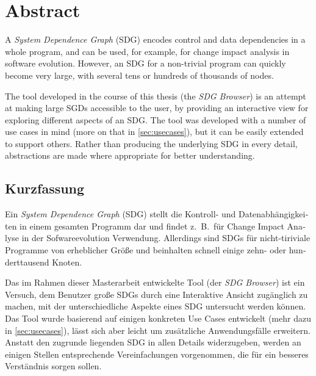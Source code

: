 \chapter*{Abstract} \vspace{-0.5cm}

A \emph{System Dependence Graph} (SDG) encodes control and data dependencies in a whole program, and can be used, for 
example, for change impact analysis in software evolution. However, an SDG for a non-trivial program can quickly become 
very large, with several tens or hundreds of thousands of nodes.

The tool developed in the course of this thesis (the \emph{SDG Browser}) is an attempt at making large SGDs accessible 
to the user, by providing an interactive view for exploring different aspects of an SDG. The tool was developed with a 
number of use cases in mind (more on that in \autoref{sec:usecases}), but it can be easily extended to support others. 
Rather than producing the underlying SDG in every detail, abstractions are made where appropriate for better 
understanding.


\begin{otherlanguage}{ngerman}
\begingroup
\let\clearpage\relax
\chapter*{Kurzfassung} \vspace{-0.5cm}
\endgroup

Ein \emph{System Dependence Graph} (SDG) stellt die Kontroll- und Datenabhängigkeiten in einem gesamten Programm dar 
und findet z.\ B.\ für Change Impact Analyse in der Sofwareevolution Verwendung. Allerdings sind SDGs für 
nicht-tiriviale Programme von erheblicher Größe und beinhalten schnell einige zehn- oder hunderttausend Knoten.

Das im Rahmen dieser Masterarbeit entwickelte Tool (der \emph{SDG Browser}) ist ein Versuch, dem Benutzer große SDGs 
durch eine Interaktive Ansicht zugänglich zu machen, mit der unterschiedliche Aspekte eines SDG untersucht werden 
können. Das Tool wurde basierend auf einigen konkreten Use Cases entwickelt (mehr dazu in \autoref{sec:usecases}), 
lässt sich aber leicht um zusätzliche Anwendungsfälle erweitern. Anstatt den zugrunde liegenden SDG in allen Details 
widerzugeben, werden an einigen Stellen entsprechende Vereinfachungen vorgenommen, die für ein besseres Verständnis 
sorgen sollen.

\end{otherlanguage}
